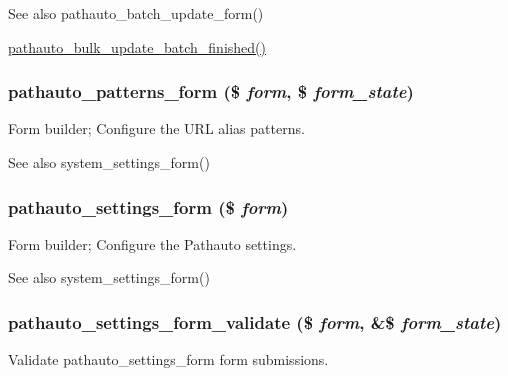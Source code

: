 \begin{DoxySeeAlso}{See also}
pathauto\_\-batch\_\-update\_\-form() 

\hyperlink{pathauto_8admin_8inc_aa4e5f7dbb4b2173c5851759c4c4a6ac0}{pathauto\_\-bulk\_\-update\_\-batch\_\-finished()} 
\end{DoxySeeAlso}
\hypertarget{pathauto_8admin_8inc_a2b3adb295ed84c13148b9c34ce0b3b73}{
\subsubsection[{pathauto\_\-patterns\_\-form}]{\setlength{\rightskip}{0pt plus 5cm}pathauto\_\-patterns\_\-form (\$ {\em form}, \/  \$ {\em form\_\-state})}}
\label{pathauto_8admin_8inc_a2b3adb295ed84c13148b9c34ce0b3b73}
Form builder; Configure the URL alias patterns.

\begin{DoxySeeAlso}{See also}
system\_\-settings\_\-form() 
\end{DoxySeeAlso}
\hypertarget{pathauto_8admin_8inc_a59b24f3617ff78cc8c9d8b3b4990b6e2}{
\subsubsection[{pathauto\_\-settings\_\-form}]{\setlength{\rightskip}{0pt plus 5cm}pathauto\_\-settings\_\-form (\$ {\em form})}}
\label{pathauto_8admin_8inc_a59b24f3617ff78cc8c9d8b3b4990b6e2}
Form builder; Configure the Pathauto settings.

\begin{DoxySeeAlso}{See also}
system\_\-settings\_\-form() 
\end{DoxySeeAlso}
\hypertarget{pathauto_8admin_8inc_ad27c29d292443ece46bfff41aee9c577}{
\subsubsection[{pathauto\_\-settings\_\-form\_\-validate}]{\setlength{\rightskip}{0pt plus 5cm}pathauto\_\-settings\_\-form\_\-validate (\$ {\em form}, \/  \&\$ {\em form\_\-state})}}
\label{pathauto_8admin_8inc_ad27c29d292443ece46bfff41aee9c577}
Validate pathauto\_\-settings\_\-form form submissions. 